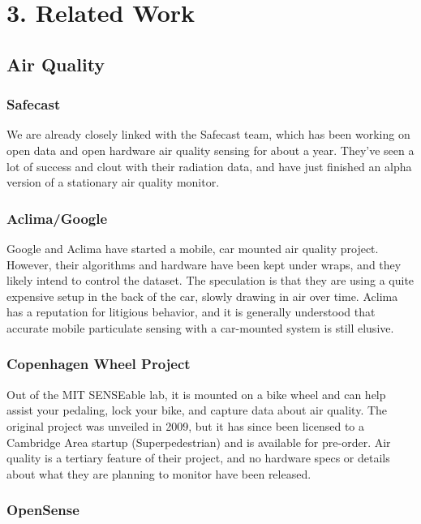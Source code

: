 \chapter{3. Related Work}

\section{Air Quality}

\subsection{Safecast}

We are already closely linked with the Safecast team, which has been working on open data and open hardware air quality sensing for about a year.  They've seen a lot of success and clout with their radiation data, and have just finished an alpha version of a stationary air quality monitor.

\subsection{Aclima/Google}

Google and Aclima have started a mobile, car mounted air quality project.  However, their algorithms and hardware have been kept under wraps, and they likely intend to control the dataset.  The speculation is that they are using a quite expensive setup in the back of the car, slowly drawing in air over time.  Aclima has a reputation for litigious behavior, and it is generally understood that accurate mobile particulate sensing with a car-mounted system is still elusive.   

\subsection{Copenhagen Wheel Project}

Out of the MIT SENSEable lab, it is mounted on a bike wheel and can help assist your pedaling, lock your bike, and capture data about air quality.  The original project was unveiled in 2009, but it has since been licensed to a Cambridge Area startup (Superpedestrian) and is available for pre-order.  Air quality is a tertiary feature of their project, and no hardware specs or details about what they are planning to monitor have been released.

\subsection{OpenSense} 

